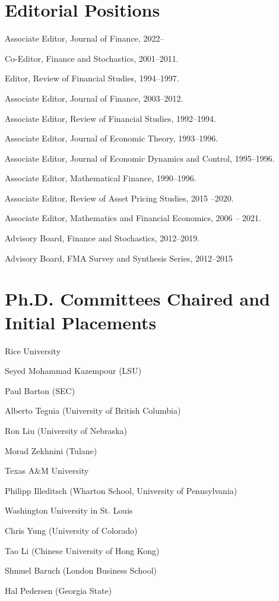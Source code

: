 \documentclass[margin, 11pt]{res}
\newenvironment{list1}{
  \begin{list}{}{%
            \setlength{\itemsep}{0in}
      \setlength{\parsep}{0in} \setlength{\parskip}{0in}
      \setlength{\topsep}{0in} \setlength{\partopsep}{0in}
      \setlength{\leftmargin}{0.2in}}}{\end{list}}
\newenvironment{list3}{
  \begin{list}{}{%
            \setlength{\itemsep}{0in}
      \setlength{\parsep}{0in} \setlength{\parskip}{0in}
      \setlength{\topsep}{0in} \setlength{\partopsep}{0in}
      \setlength{\leftmargin}{0.2in}}}{\vspace*{.15in}\end{list}}
\begin{document}
\begin{resume}
\section{\sc Editorial Positions}
\begin{list1}
\item Associate Editor, Journal of Finance, 2022--
\item Co-Editor, Finance and Stochastics, 2001--2011.
\item Editor, Review of Financial Studies, 1994--1997.
\item Associate Editor, Journal of Finance, 2003--2012.
\item Associate Editor, Review of Financial Studies, 1992--1994.
\item Associate Editor, Journal of Economic Theory, 1993--1996.
\item Associate Editor, Journal of Economic Dynamics and Control,
1995--1996.
\item Associate Editor, Mathematical Finance, 1990--1996.
\item Associate Editor, Review of Asset Pricing Studies, 2015 --2020.
\item Associate Editor, Mathematics and Financial Economics, 2006 -- 2021.
\item Advisory Board, Finance and Stochastics, 2012--2019.
\item Advisory Board, FMA Survey and Synthesis Series, 2012--2015
\end{list1}

\section{\sc Ph.D. Committees Chaired and Initial Placements}
\begin{list1}
\item Rice University
\begin{list3}
\item Seyed Mohammad Kazempour (LSU)
\item Paul Barton (SEC)
\item  Alberto Teguia (University of British Columbia)
\item Ron Liu (University of Nebraska)
\item   Morad Zekhnini (Tulane)


\end{list3}
   \item Texas A\&M University
\begin{list3}
\item   Philipp Illeditsch (Wharton School, University of Pennsylvania)
\end{list3}
 \item Washington University in St. Louis
\begin{list3}
\item  Chris Yung (University of Colorado)
\item  Tao Li (Chinese University of Hong Kong)
\item    Shmuel Baruch (London Business School)
\item Hal Pedersen (Georgia State)


\end{list3}
\end{list1}
\end{resume}
\end{document}
